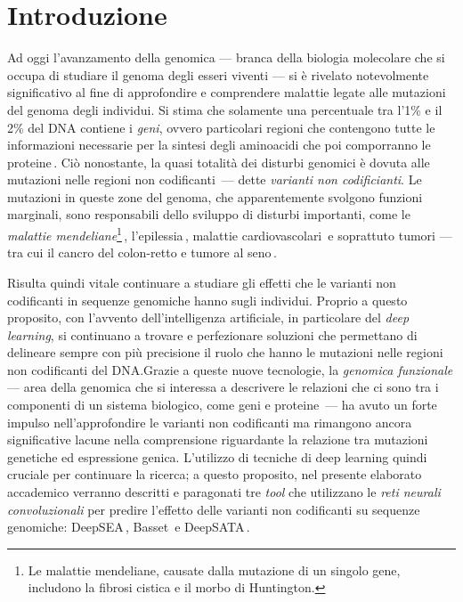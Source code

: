 
\chapter{Introduzione}\label{chp:introduction}

Ad oggi l'avanzamento della genomica — branca della biologia molecolare che si occupa di studiare il genoma degli esseri viventi — si è rivelato notevolmente significativo al fine di approfondire e comprendere malattie legate alle mutazioni del genoma degli individui. Si stima che solamente una percentuale tra l'1\% e il 2\% del DNA contiene i \textsl{geni}, ovvero particolari regioni che contengono tutte le informazioni necessarie per la sintesi degli aminoacidi che poi comporranno le proteine\,\cite{sahu2011identification, pollard2022cell}. Ciò nonostante, la quasi totalità dei disturbi genomici è dovuta alle mutazioni nelle regioni non codificanti\,\cite{zhang2015non} — dette \textsl{varianti non codificianti}. Le mutazioni in queste zone del genoma, che apparentemente svolgono funzioni marginali, sono responsabili dello sviluppo di disturbi importanti, come le \textsl{malattie mendeliane}\footnote{Le malattie mendeliane, causate dalla mutazione di un singolo gene, includono la fibrosi cistica e il morbo di Huntington.}\,\cite{french2020role, chial2008mendelian}, l'epilessia\,\cite{pagni2022non}, malattie cardiovascolari\,\cite{kapoor2014enhancer, zhang2015non} e soprattuto tumori — tra cui il cancro del colon-retto e tumore al seno\,\cite{khurana2016role, tian2019systematic, bojesen2013multiple, michailidou2017association}.

Risulta quindi vitale continuare a studiare gli effetti che le varianti non codificanti in sequenze genomiche hanno sugli individui. Proprio a questo proposito, con l'avvento dell'intelligenza artificiale, in particolare del \textsl{deep learning}, si continuano a trovare e perfezionare soluzioni che permettano di delineare sempre con più precisione il ruolo che hanno le mutazioni nelle regioni non codificanti del DNA.\@ Grazie a queste nuove tecnologie, la \textsl{genomica funzionale} — area della genomica che si interessa a descrivere le relazioni che ci sono tra i componenti di un sistema biologico, come geni e proteine\,\cite{caudai2021ai} — ha avuto un forte impulso nell'approfondire le varianti non codificanti ma rimangono ancora significative lacune nella comprensione riguardante la relazione tra mutazioni genetiche ed espressione genica. L'utilizzo di tecniche di deep learning quindi cruciale per continuare la ricerca; a questo proposito, nel presente elaborato accademico verranno descritti e paragonati tre \textsl{tool} che utilizzano le \textsl{reti neurali convoluzionali} per predire l'effetto delle varianti non codificanti su sequenze genomiche: DeepSEA\,\cite{zhou2015predicting}, Basset\,\cite{kelley2016basset} e DeepSATA\,\cite{ma2023deepsata}.



